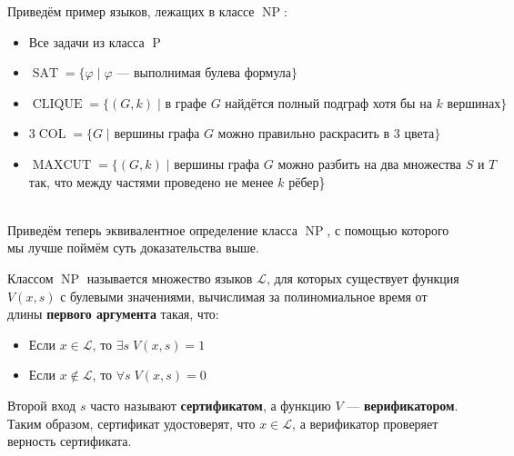 \documentclass[11pt]{article}
\DeclareMathOperator{\SAT}{SAT}
\DeclareMathOperator{\CLIQUE}{CLIQUE}
\DeclareMathOperator{\COL}{COL}
\DeclareMathOperator{\MAXCUT}{MAXCUT}
\DeclareMathOperator{\Poly}{P}
\DeclareMathOperator{\NP}{NP}
\begin{document}
\begin{example}
    Приведём пример языков, лежащих в классе $\NP$:
    \begin{itemize}
        \item Все задачи из класса $\Poly$
        \item $\SAT = \{\varphi \; | \; \varphi \text{ --- выполнимая булева формула}\}$
        \item $\CLIQUE = \{(G, k) \; | \text{ в графе } G \text{ найдётся полный подграф хотя бы на } k \text{ вершинах}\}$
        \item $3\COL = \{G \; | \text{ вершины графа } G \text{ можно правильно раскрасить в } 3 \text{ цвета}\}$
        \item $\MAXCUT = \{(G, k) \; | \text{ вершины графа } G \text{ можно разбить на два множества } S \text{ и } T$ так, что между частями проведено не менее $k$ рёбер\}
    \end{itemize}
\end{example} \leavevmode
\\
Приведём теперь эквивалентное определение класса $\NP$, с помощью которого мы лучше поймём суть доказательства выше.

\begin{definition}
    Классом $\NP$ называется множество языков $\mathcal{L}$, для которых существует функция $V(x, s)$ с булевыми значениями, вычислимая за полиномиальное время от длины \textbf{первого аргумента} такая, что:
    \begin{itemize}
        \item Если $x \in \mathcal{L}$, то $\exists s \; V(x, s) = 1$
        \item Если $x \not \in \mathcal{L}$, то $\forall s \; V(x, s) = 0$
    \end{itemize}
    Второй вход $s$ часто называют \textbf{сертификатом}, а функцию $V$ --- \textbf{верификатором}. Таким образом, сертификат удостоверят, что $x \in \mathcal{L}$, а верификатор проверяет верность сертификата.
\end{definition}
\end{document}
